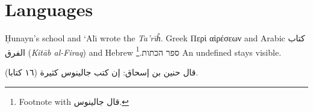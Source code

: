 \documentclass{article}
\newcommand{\hunayn}{\d{H}unayn\xspace}
\newcommand{\ishaqtarih}{\textit{Ta'r\={\i}\U{h}}\xspace}
\newcommand{\ali}{`Al\={\i}\xspace}
\begin{document}
\section{Languages}
\hunayn's school and \ali wrote the \ishaqtarih. Greek \textgreek{Περὶ αἱρέσεων}
and Arabic \textarabic{كتاب الفرق} (\textit{Kit\={a}b al-Firaq}) and Hebrew
\texthebrew{ספר הכתות}.\footnote{Footnote with \textarabic{قال جالينوس}.}
An undefined  stays visible.

\begin{Arabic}
قال حنين بن إسحاق: إن كتب جالينوس كثيرة (١٦ كتابا).
\end{Arabic}
\end{document}
